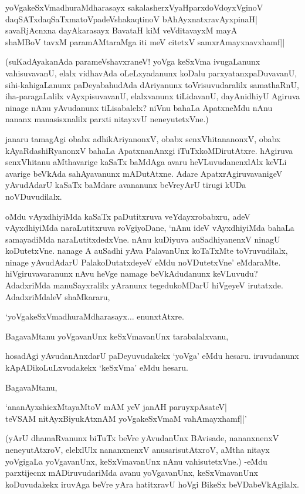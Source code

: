 \begin{shloka}
yoVgakeSxVmadhuraMdharasayx sakalasherxVyaHparxdoVdoyxVginoV\\
daqSATxdaqSaTxmatoVpadeVshakaqtinoV bAhAyxnatxravAyxpinaH|\\
savaRjAcnxna dayAkarasayx BavataH kiM veVditavayxM mayA\\
shaMBoV tavxM paramAMtaraMga iti meV citetxV samxrAmayxnavxhamf||
\end{shloka}

(suKadAyakanAda parameVshavxraneV! yoVga keSxVma ivugaLanunx vahisuvavanU, elalx vidhavAda oLeLxyadanunx koDalu parxyatanxpaDuvavanU, sihi-kahigaLanunx paDeyabahudAda dAriyanunx toVrisuvudaralilx samathaRnU, iha-paragaLalilx vAyxpisuvavanU, elalxvanunx tiLidavanU, dayAnidhiyU Agiruva ninage nAnu yAvudanunx tiLisabalelx? niVnu bahaLa ApatxneMdu nAnu nananx manasisxnalilx parxti nitayxvU neneyutetxVne.)

janaru tamagAgi obabx adhikAriyanonxV, obabx senxVhitananonxV, obabx kAyaRdashiRyanonxV bahaLa ApatxnanAnxgi iTuTxkoMDirutAtxre. hAgiruva senxVhitanu aMthavarige kaSaTx baMdAga avaru heVLuvudanenxlAlx keVLi avarige beVkAda sahAyavanunx mADutAtxne. Adare ApatxrAgiruvavanigeV yAvudAdarU kaSaTx baMdare avananunx beVreyArU tirugi kUDa noVDuvudilalx.

oMdu vAyxdhiyiMda kaSaTx paDutitxruva veYdayxrobabxru, adeV vAyxdhiyiMda naraLutitxruva roVgiyoDane, `nAnu ideV vAyxdhiyiMda bahaLa samayadiMda naraLutitxdedxVne. nAnu kuDiyuva auSadhiyanenxV ninagU koDutetxVne. nanage A auSadhi yAva PalavanUnx koTaTxMte toVruvudilalx, ninage yAvudAdarU PalakoDutatxdeyeV eMdu noVDutetxVne' eMdaraMte. hiVgiruvavaranunx nAvu heVge namage beVkAdudanunx keVLuvudu? AdadxriMda manuSayxralilx yAranunx tegedukoMDarU hiVgeyeV irutatxde. AdadxriMdaleV shaMkararu,

`yoVgakeSxVmadhuraMdharasayx$\ldots$ enunxtAtxre.

BagavaMtanu yoVgavanUnx keSxVmavanUnx tarabalalxvanu,

hosadAgi yAvudanAnxdarU paDeyuvudakekx `yoVga' eMdu hesaru. iruvudanunx kApADikoLuLxvudakekx `keSxVma' eMdu hesaru.

BagavaMtanu,

\begin{shloka}
`ananAyxshicxMtayaMtoV mAM yeV janAH paruyxpAsateV|\\
teVSAM nitAyxBiyukAtxnAM yoVgakeSxVmaM vahAmayxhamf||'
\end{shloka}

(yArU dhamaRvanunx biTuTx beVre yAvudanUnx BAvisade, nananxnenxV neneyutAtxroV, elelxlUlx nananxnenxV anusarisutAtxroV, aMtha nitayx yoVgigaLa yoVgavanUnx, keSxVmavanUnx nAnu vahisutetxVne.) -eMdu parxtijecnx mADiruvudariMda avanu yoVgavanUnx, keSxVmavanUnx koDuvudakekx iruvAga beVre yAra hatitxravU hoVgi BikeSx beVDabeVkAgilalx.

